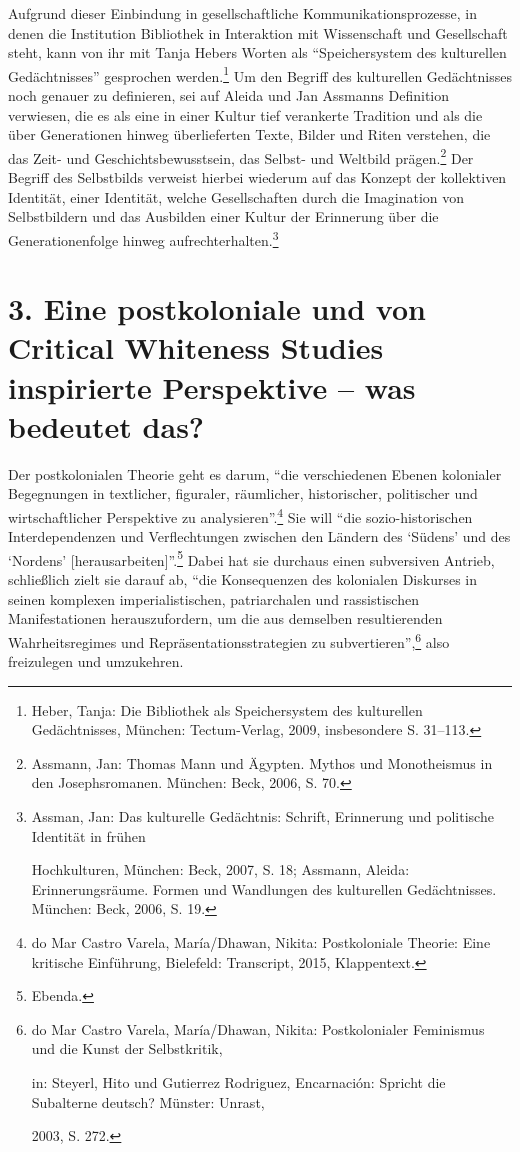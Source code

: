 \documentclass[a4paper,
fontsize=11pt,
oneside,
numbers=noperiodatend,
parskip=half-,
bibliography=totoc,
final
]{scrartcl}
\begin{document}
Aufgrund dieser Einbindung in gesellschaftliche Kommunikationsprozesse,
in denen die Institution Bibliothek in Interaktion mit Wissenschaft und
Gesellschaft steht, kann von ihr mit Tanja Hebers Worten als
\enquote{Speichersystem des kulturellen Gedächtnisses} gesprochen
werden.\footnote{Heber, Tanja: Die Bibliothek als Speichersystem des
  kulturellen Gedächtnisses, München: Tectum-Verlag, 2009, insbesondere
  S. 31--113.} Um den Begriff des kulturellen Gedächtnisses noch genauer
zu definieren, sei auf Aleida und Jan Assmanns Definition verwiesen, die
es als eine in einer Kultur tief verankerte Tradition und als die über
Generationen hinweg überlieferten Texte, Bilder und Riten verstehen, die
das Zeit- und Geschichtsbewusstsein, das Selbst- und Weltbild
prägen.\footnote{Assmann, Jan: Thomas Mann und Ägypten. Mythos und
  Monotheismus in den Josephsromanen. München: Beck, 2006, S. 70.} Der
Begriff des Selbstbilds verweist hierbei wiederum auf das Konzept der
kollektiven Identität, einer Identität, welche Gesellschaften durch die
Imagination von Selbstbildern und das Ausbilden einer Kultur der
Erinnerung über die Generationenfolge hinweg
aufrechterhalten.\footnote{Assman, Jan: Das kulturelle Gedächtnis:
  Schrift, Erinnerung und politische Identität in frühen

  Hochkulturen, München: Beck, 2007, S. 18; Assmann, Aleida:
  Erinnerungsräume. Formen und Wandlungen des kulturellen Gedächtnisses.
  München: Beck, 2006, S. 19.}

\hypertarget{eine-postkoloniale-und-von-critical-whiteness-studies-inspirierte-perspektive-was-bedeutet-das}{%
\section{3. Eine postkoloniale und von Critical Whiteness Studies
inspirierte Perspektive -- was bedeutet
das?}\label{eine-postkoloniale-und-von-critical-whiteness-studies-inspirierte-perspektive-was-bedeutet-das}}

Der postkolonialen Theorie geht es darum, \enquote{die verschiedenen
Ebenen kolonialer Begegnungen in textlicher, figuraler, räumlicher,
historischer, politischer und wirtschaftlicher Perspektive zu
analysieren}.\footnote{do Mar Castro Varela, María/Dhawan, Nikita:
  Postkoloniale Theorie: Eine kritische Einführung, Bielefeld:
  Transcript, 2015, Klappentext.} Sie will \enquote{die
sozio-historischen Interdependenzen und Verflechtungen zwischen den
Ländern des \enquote*{Südens} und des \enquote*{Nordens}
{[}herausarbeiten{]}}.\footnote{Ebenda.} Dabei hat sie durchaus einen
subversiven Antrieb, schließlich zielt sie darauf ab, \enquote{die
Konsequenzen des kolonialen Diskurses in seinen komplexen
imperialistischen, patriarchalen und rassistischen Manifestationen
herauszufordern, um die aus demselben resultierenden Wahrheitsregimes
und Repräsentationsstrategien zu subvertieren},\footnote{do Mar Castro
  Varela, María/Dhawan, Nikita: Postkolonialer Feminismus und die Kunst
  der Selbstkritik,

  in: Steyerl, Hito und Gutierrez Rodriguez, Encarnación: Spricht die
  Subalterne deutsch? Münster: Unrast,

  2003, S. 272.} also freizulegen und umzukehren.
\end{document}
